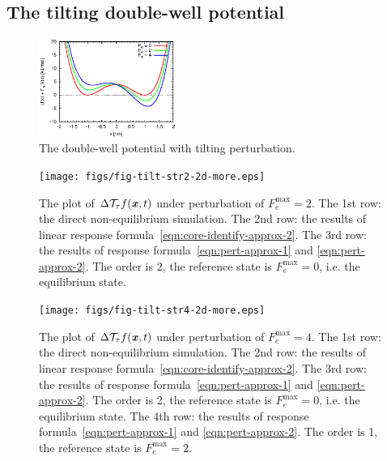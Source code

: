 \documentclass[aip,jcp,a4paper,reprint,onecolumn]{revtex4-1}
\newcommand{\vect}[1]{\textbf{\textit{#1}}}
\newcommand{\mt}{\mathcal T}
\begin{document}
\subsection{The tilting double-well potential}

\begin{figure}
  \centering
  \includegraphics[width=0.4\textwidth]{figs/fig-tilt-pot.eps}
  \caption{The double-well potential with tilting perturbation.}
  \label{fig:tmp1}
\end{figure}

\begin{figure}
  \centering
  \texttt{[image: figs/fig-tilt-str2-2d-more.eps]}
  \caption{The plot of $\Delta\mt_\tau f(\vect x,t)$  under perturbation of
    $F_e^{\textrm{max}} = 2$.
    The 1st row: the direct non-equilibrium
    simulation. The 2nd row: the results of linear response
    formula~\eqref{eqn:core-identify-approx-2}.
    The 3rd row: the results of response
    formula~\eqref{eqn:pert-approx-1} and \eqref{eqn:pert-approx-2}.
    The order is 2, the reference state is $F_e^{\textrm{max}} = 0$, i.e.
    the equilibrium state.
  }
  \label{fig:tmp2}
\end{figure}

\begin{figure}
  \centering
  \texttt{[image: figs/fig-tilt-str4-2d-more.eps]}
  \caption{The plot of $\Delta\mt_\tau f(\vect x,t)$  under perturbation of
    $F_e^{\textrm{max}} = 4$.
    The 1st row: the direct non-equilibrium
    simulation. The 2nd row: the results of linear response
    formula~\eqref{eqn:core-identify-approx-2}.
    The 3rd row: the results of response
    formula~\eqref{eqn:pert-approx-1} and \eqref{eqn:pert-approx-2}.
    The order is 2, the reference state is $F_e^{\textrm{max}} = 0$, i.e.
    the equilibrium state.
    The 4th row: the results of response
    formula~\eqref{eqn:pert-approx-1} and \eqref{eqn:pert-approx-2}.
    The order is 1, the reference state is $F_e^{\textrm{max}} = 2$.
  }
  \label{fig:tmp3}
\end{figure}
\end{document}
